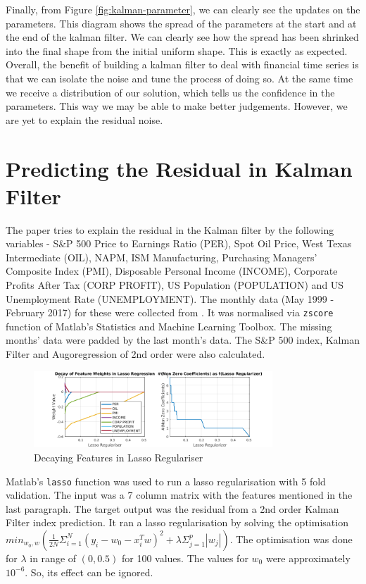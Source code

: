 \documentclass[11pt, fleqn]{article}
\begin{document}
Finally, from Figure \ref{fig:kalman-parameter}, we can clearly see the updates on the parameters. This diagram shows the spread of the parameters at the start and at the end of the kalman filter. We can clearly see how the spread has been shrinked into the final shape from the initial uniform shape. This is exactly as expected.\\

Overall, the benefit of building a kalman filter to deal with financial time series is that we can isolate the noise and tune the process of doing so. At the same time we receive a distribution of our solution, which tells us the confidence in the parameters. This way we may be able to make better judgements. However, we are yet to explain the residual noise.

\section{Predicting the Residual in Kalman Filter}

The paper tries to explain the residual in the Kalman filter by the following variables - S\&P 500 Price to Earnings Ratio (PER), Spot Oil Price, West Texas Intermediate (OIL), NAPM, ISM Manufacturing, Purchasing Managers' Composite Index (PMI), Disposable Personal Income (INCOME), Corporate Profits After Tax (CORP PROFIT), US Population (POPULATION) and US Unemployment Rate (UNEMPLOYMENT). The monthly data (May 1999 - February 2017) for these were collected from \cite{fed}. It was normalised via \texttt{zscore} function of Matlab's Statistics and Machine Learning Toolbox. The missing months' data were padded by the last month's data. The S\&P 500 index, Kalman Filter and Augoregression of 2nd order were also calculated. \\

\begin{figure}[!h]
    \centering
    \includegraphics[width=0.8\textwidth]{decay-lasso.png}
	\caption{Decaying Features in Lasso Regulariser}
	\label{fig:decay-lasso}
\end{figure}

Matlab's \texttt{lasso} function was used to run a lasso regularisation with 5 fold validation. The input was a 7 column matrix with the features mentioned in the last paragraph. The target output was the residual from a 2nd order Kalman Filter index prediction. It ran a lasso regularisation by solving the optimisation $min_{w_0, w}(\frac{1}{2N}\Sigma_{i=1}^N(y_i - w_0 - x_i^Tw)^2 + \lambda\Sigma_{j=1}^p|w_j|)$. The optimisation was done for $\lambda$ in range of $(0,0.5)$ for 100 values. The values for $w_0$ were approximately $10^{-6}$. So, its effect can be ignored.\\
\end{document}
